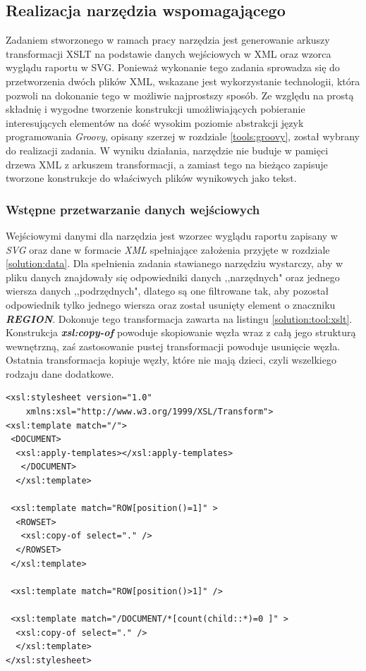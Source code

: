 \documentclass[11pt,a4paper]{article}
\begin{document}
\subsection{Realizacja narzędzia wspomagającego} \label{solution:tool}
Zadaniem stworzonego w ramach pracy narzędzia jest generowanie arkuszy transformacji XSLT na podstawie danych wejściowych w XML oraz wzorca wyglądu raportu w SVG. Ponieważ wykonanie tego zadania sprowadza się do przetworzenia dwóch plików XML, wskazane jest wykorzystanie technologii, która pozwoli na dokonanie tego w możliwie najprostszy sposób. Ze względu na prostą składnię i wygodne tworzenie konstrukcji umożliwiających pobieranie interesujących elementów na dość wysokim poziomie abstrakcji język programowania \emph{Groovy}, opisany szerzej w rozdziale \ref{tools:groovy}, został wybrany do realizacji zadania.  W wyniku działania, narzędzie nie buduje w pamięci drzewa XML z arkuszem transformacji, a zamiast tego na bieżąco zapisuje tworzone konstrukcje do właściwych plików wynikowych jako tekst.

\subsubsection{Wstępne przetwarzanie danych wejściowych} \label{solution:tool:input}
Wejściowymi danymi dla narzędzia jest wzorzec wyglądu raportu zapisany w \emph{SVG} oraz dane w formacie \emph{XML} spełniające założenia przyjęte w rozdziale \ref{solution:data}.  Dla spełnienia zadania stawianego narzędziu wystarczy, aby w pliku danych znajdowały się odpowiedniki danych ,,narzędnych" oraz jednego wiersza danych ,,podrzędnych", dlatego są one filtrowane tak, aby pozostał odpowiednik tylko jednego wiersza oraz został usunięty element o znaczniku \emph{\textbf{REGION}}. Dokonuje tego transformacja zawarta na listingu \ref{solution:tool:xslt}. Konstrukcja \textbf{\emph{xsl:copy-of}} powoduje skopiowanie węzła wraz z całą jego strukturą wewnętrzną, zaś zastosowanie pustej transformacji powoduje usunięcie węzła. Ostatnia transformacja kopiuje węzły, które nie mają dzieci, czyli wszelkiego rodzaju dane dodatkowe. 

\lstset{language=XSLT}
\begin{lstlisting}[frame=single,caption=Transformacja wstępnie przetwarzająca dane, label=solution:tool:xslt]
<xsl:stylesheet version="1.0" 
    xmlns:xsl="http://www.w3.org/1999/XSL/Transform">
<xsl:template match="/">
 <DOCUMENT>
  <xsl:apply-templates></xsl:apply-templates>
   </DOCUMENT>
  </xsl:template>

 <xsl:template match="ROW[position()=1]" >
  <ROWSET>
   <xsl:copy-of select="." />
  </ROWSET>
 </xsl:template>

 <xsl:template match="ROW[position()>1]" />

 <xsl:template match="/DOCUMENT/*[count(child::*)=0 ]" >
  <xsl:copy-of select="." />
  </xsl:template>
</xsl:stylesheet>
\end{lstlisting}
\end{document}
